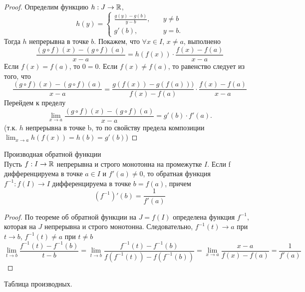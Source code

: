     \begin{proof}
        Определим функцию $h: J \to \mathbb{R}$, 
        \[ h(y) =
        \begin{cases}
            \frac{g(y) - g(b)}{y - b},       & \quad y \neq b\\
            g'(b),  & \quad y = b.
        \end{cases}
        \]
        Тогда $h$ непрерывна в точке $b$. Покажем, что $\forall x \in I$, $x \neq a$, выполнено
        \[\frac{(g\circ f)(x) - (g\circ f)(a)}{x - a} = h(f(x)) \cdot \frac{f(x) - f(a)}{x - a}\]
        Если $f(x) = f(a)$, то $0 = 0$. Если $f(x) \neq f(a)$, то равенство следует из того, что
        \[\frac{(g\circ f)(x) - (g\circ f)(a)}{x - a} = \frac{g(f(x)) - g(f(a)))}{f(x) - f(a)} \cdot \frac{f(x) - f(a)}{x - a}\]
        Перейдем к пределу
        \[\lim_{x \to a} \frac{(g\circ f)(x) - (g\circ f)(a)}{x - a} = g'(b)\cdot f'(a).\]
        (т.к. $h$ непрерывна в точке b, то по свойству предела композиции $\lim_{x \to a} h(f(x)) = h(b) = g'(b)$)
    \end{proof}
    
    \begin{theorem}{Производная обратной функции}\\
        Пусть $f: I \to \mathbb{R}$ непрерывна и строго монотонна на промежутке $I$. Если f дифференцируема в точке $a \in I$ и $f'(a) \neq 0$, то обратная функция $f^{-1}: f(I) \to I$ дифференцируема в точке $b = f(a)$, причем
        \[(f^{-1})'(b) = \frac{1}{f'(a)}\]
    \end{theorem}
    
    \begin{proof}
        По теореме об обратной функции на $J = f(I)$ определена функция $f^{-1}$, которая на $J$ непрерывна и строго монотонна. Следовательно, $f^{-1}(t) \to a$ при $t \to b$, $f^{-1}(t) \neq a$ при $t \neq b$
        \[\lim_{t \to b} \frac{f^{-1}(t) - f^{-1}(b)}{t - b} = \lim_{t \to b} \frac{f^{-1}(t)-f^{-1}(b)}{f(f^{-1}(t)) - f(f^{-1}(b))} = \lim_{x \to a}\frac{x - a}{f(x) - f(a)} = \frac{1}{f'(a)}\]
    \end{proof}
    
    Таблица производных.
    
